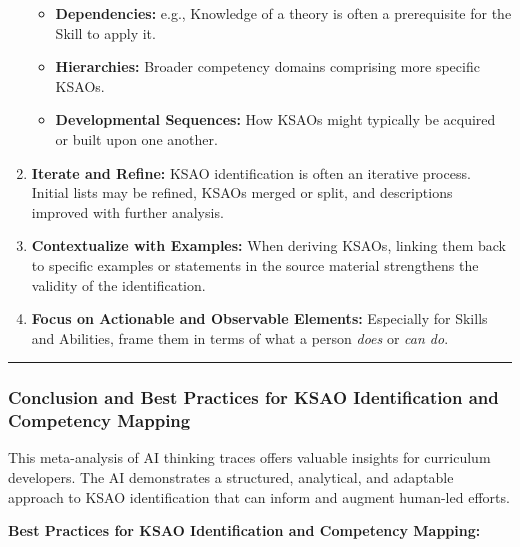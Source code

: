 \documentclass[
  letterpaper,
  DIV=11,
  numbers=noendperiod]{scrartcl}
\providecommand{\tightlist}{%
  \setlength{\itemsep}{0pt}\setlength{\parskip}{0pt}}
\begin{document}
\begin{enumerate}
  \begin{itemize}
  \tightlist
  \item
    \textbf{Dependencies:} e.g., Knowledge of a theory is often a
    prerequisite for the Skill to apply it.
  \item
    \textbf{Hierarchies:} Broader competency domains comprising more
    specific KSAOs.
  \item
    \textbf{Developmental Sequences:} How KSAOs might typically be
    acquired or built upon one another.
  \end{itemize}
\item
  \textbf{Iterate and Refine:} KSAO identification is often an iterative
  process. Initial lists may be refined, KSAOs merged or split, and
  descriptions improved with further analysis.
\item
  \textbf{Contextualize with Examples:} When deriving KSAOs, linking
  them back to specific examples or statements in the source material
  strengthens the validity of the identification.
\item
  \textbf{Focus on Actionable and Observable Elements:} Especially for
  Skills and Abilities, frame them in terms of what a person \emph{does}
  or \emph{can do}.
\end{enumerate}

\begin{center}\rule{0.5\linewidth}{0.5pt}\end{center}

\subsubsection{Conclusion and Best Practices for KSAO Identification and
Competency
Mapping}\label{conclusion-and-best-practices-for-ksao-identification-and-competency-mapping}

This meta-analysis of AI thinking traces offers valuable insights for
curriculum developers. The AI demonstrates a structured, analytical, and
adaptable approach to KSAO identification that can inform and augment
human-led efforts.

\textbf{Best Practices for KSAO Identification and Competency Mapping:}
\end{document}
